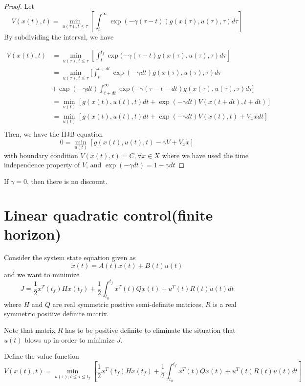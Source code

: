 \begin{refsection}
\begin{proof}
Let $$V(x(t),t)=\min_{u(\tau),t\leq \tau }[ \int_t^{\infty} \exp(-\gamma (\tau-t)) g(x(\tau),u(\tau),\tau) d\tau ]$$By subdividing the interval, we have

\begin{align*}
    V(x(t),t) &=\min_{u(\tau),t\leq \tau }[ \int_t^{t_f} \exp(-\gamma (\tau-t) g(x(\tau),u(\tau),\tau) d\tau ]\\
    &= \min_{u(\tau),t\leq \tau }[ \int_t^{t + dt}  \exp(-\gamma dt) g(x(\tau),u(\tau),\tau) d\tau \\  & + \exp(-\gamma dt) \int_{t+dt}^{\infty} \exp(-\gamma (\tau-t-dt) g(x(\tau),u(\tau),\tau) d\tau  ]\\
    &= \min_{u(t)}[ g(x(t),u(t),t) dt +  \exp(-\gamma dt) V(x(t+dt),t+dt)]\\
    & = \min_{u(t)}[ g(x(t),u(t),t) dt + \exp(-\gamma dt) V(x(t),t) + V_x \dot{x}dt]\\
\end{align*}
Then, we have the HJB equation 
$$0 = \min_{u(t)}[ g(x(t),u(t),t) -\gamma V+ V_x \dot{x}] $$
with boundary condition $V(x(t),t) = C, \forall x\in X$
where we have used the time independence property of $V$, and $\exp(-\gamma dt) = 1-\gamma dt$
\end{proof}

\begin{remark}
If $\gamma = 0$, then there is no discount.
\end{remark}


\section{Linear quadratic control(finite horizon)}
\begin{definition}
Consider the system state equation given as
$$\dot{x}(t) = A(t)x(t) + B(t)u(t)$$
and we want to minimize
$$J = \frac{1}{2}x^T(t_f)Hx(t_f) + \frac{1}{2}\int_{t_0}^{t_f} x^T(t)Qx(t) + u^T(t)R(t)u(t) dt$$
where $H$ and $Q$ are real symmetric positive semi-definite matrices, $R$ is a real symmetric positive definite matrix.
\end{definition}

\begin{remark}
Note that matrix $R$ has to be positive definite to eliminate the situation that $u(t)$ blows up in order to minimize $J$.
\end{remark}


\begin{theorem}
	Define the value function $$V(x(t),t)=\min_{u(\tau),t\leq \tau \leq t_f}[\frac{1}{2}x^T(t_f)Hx(t_f) + \frac{1}{2}\int_{t_0}^{t_f} x^T(t)Qx(t) + u^T(t)R(t)u(t) dt]$$
	

\end{theorem}
\end{refsection}
